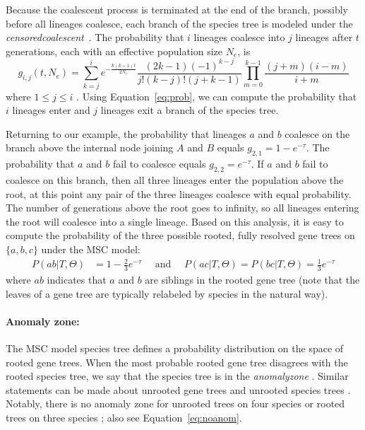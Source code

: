 Because the coalescent process is terminated at the end of the branch, possibly before all lineages coalesce, each branch of the species tree is modeled under the \textit{\gls{censoredcoalescent}}~\cite{rannala2003bayes}.  
The probability that $i$ lineages coalesce into $j$ lineages after $t$ generations, each with an effective population size $N_e$, is
\begin{equation}
	\label{eq:prob}
	g_{i,j}(t, N_e) = \sum_{k=j}^i e^{-\frac{k(k-1)t}{2N_e}} \frac{(2k-1)(-1)^{k-j}}{j!(k-j)!(j+k-1)} \prod_{m=0}^{k-1} \frac{(j + m)(i-m)}{i + m} 
\end{equation}
where $1 \le j \le i$ \cite{tavare1984line, allman2011identifying}.
Using Equation~\ref{eq:prob}, we can compute the probability that $i$ lineages enter and $j$ lineages exit a branch of the species tree.

Returning to our example, the probability that lineages $a$ and $b$ coalesce on the branch above the internal node joining $A$ and $B$ equals $g_{2,1} = 1 - e^{-\tau}$.
The probability that $a$ and $b$ fail to coalesce equals $g_{2,2} = e^{-\tau}$.
If $a$ and $b$ fail to coalesce on this branch, then all three lineages enter the population above the root, at this point any pair of the three lineages coalesce with equal probability.
The number of generations above the root goes to infinity,  so all lineages entering the root will coalesce into a single lineage.
Based on this analysis, it is easy to compute the probability of the three possible rooted, fully resolved gene trees on $\{ a, b, c \}$ under the MSC model:
\begin{align}
	P( ab | T, \Theta) &= 1 - \frac{2}{3} e^{ -\tau} \quad \text{ and } \quad P(ac | T, \Theta) = P(bc | T, \Theta) = \frac{1}{3} e^{ -\tau} \label{eq:noanom}
\end{align}
where $ab$ indicates that $a$ and $b$ are siblings in the rooted gene tree (note that the leaves of a gene tree are typically relabeled by species in the natural way).

\paragraph{Anomaly zone:} 
The MSC model species tree defines a probability distribution on the space of rooted gene trees. 
When the most probable rooted gene tree disagrees with the rooted species tree, we say that the species tree is in the \textit{\gls{anomalyzone}} \cite{degnan2006discordance}.
Similar statements can be made about \gls{unrooted} gene trees and unrooted species trees \cite{degnan2013anomalous}.
Notably, there is no anomaly zone for unrooted trees on four species \cite{allman2011identifying} or rooted trees on three species \cite{degnan2006discordance, degnan2009gene}; also see Equation~\ref{eq:noanom}.

